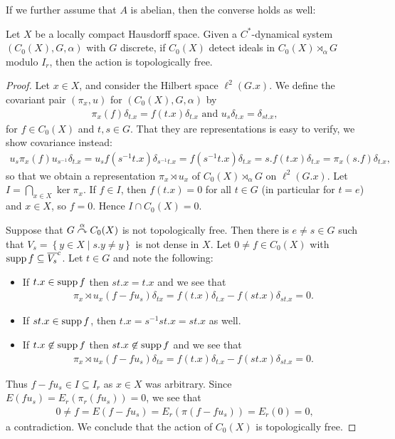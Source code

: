 If we further assume that $A$ is abelian, then the converse holds as well:
\begin{theorem}
	Let $X$ be a locally compact Hausdorff space. Given a $C^*$-dynamical system $(C_0(X),G,\alpha)$ with $G$ discrete, if $C_0(X)$ detect ideals in $C_0(X) \rtimes_{\alpha}G$ modulo $I_r$, then the action is topologically free.
	\label{ASthm2}
\end{theorem}
\begin{proof}
	Let $x \in X$, and consider the Hilbert space $\ell^2(G.x)$. We define the covariant pair $(\pi_x,u)$ for $(C_0(X),G,\alpha)$ by
	\begin{align*}
		\pi_x(f) \delta_{t.x} = f(t.x) \delta_{t.x} \text{ and } u_s \delta_{t.x} = \delta_{st.x},
	\end{align*}
	for $f \in C_0(X)$ and $t,s \in G$. That they are representations is easy to verify, we show covariance instead:
	\begin{align*}
		u_s \pi_x(f) u_{s^{-1}} \delta_{t.x} = u_{s} f(s^{-1}t.x)\delta_{s^{-1}t.x} = f(s^{-1}t.x) \delta_{t.x} = s.f(t.x)\delta_{t.x} = \pi_x(s.f)\delta_{t.x},
	\end{align*}
	so that we obtain a representation $\pi_x \rtimes u_x$ of $C_0(X) \rtimes_\alpha G$ on $\ell^2(G.x)$. Let $I = \bigcap_{x \in  X} \ker \pi_{x}$. If $f \in I$, then $f(t.x) = 0$ for all $t \in G$ (in particular for $t=e$) and $x \in  X$, so $f = 0$. Hence $I \cap C_0(X) = 0$.
	
	Suppose that $G \stackrel{\alpha}{\curvearrowright} C_0(X)$ is not topologically free. Then there is $e \neq s \in G$ such that $V_s=\left\{ y \in X  \mid s.y \neq y \right\}$ is not dense in $X$. Let $0 \neq f \in C_0(X)$ with $\operatorname{supp} f \subseteq \overline{V_s}^c$. Let $t \in G$ and note the following:
	\begin{itemize}[nosep]
	\item If $t.x \in \operatorname{supp} f$ then $st.x = t.x$ and we see that
	\begin{align*}
		\pi_x\rtimes u_x(f-fu_s)\delta_{tx} = f(t.x) \delta_{t.x} - f(st.x)\delta_{st.x}= 0.
	\end{align*}
	\item If $st.x  \in \operatorname{supp} f$, then $t.x = s^{-1}st.x = st.x$ as well.
	\item If $t.x \not \in \operatorname{supp} f$ then $st.x \not \in \operatorname{supp} f$ and we see that
	\begin{align*}
		\pi_x\rtimes u_x(f-fu_s)\delta_{tx} = f(t.x) \delta_{t.x} - f(st.x)\delta_{st.x}= 0.
	\end{align*}
\end{itemize}
	 Thus $f-f u_s \in I \subseteq I_r$ as $x \in X$ was arbitrary. Since $E(f u_s) = E_r(\pi_r(fu_s)) =0$, we see that 
	\begin{align*}
		0 \neq f = E(f-fu_s) = E_r (\pi(f-fu_s))= E_r(0) =0,
	\end{align*}
	a contradiction. We conclude that the action of $C_0(X)$ is topologically free.
\end{proof}
